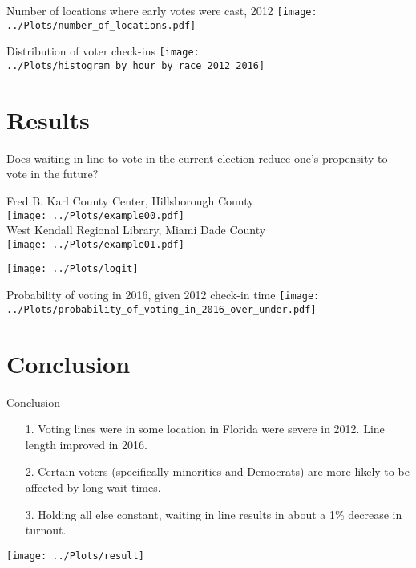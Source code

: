 \documentclass{beamer}
\begin{document}
		\begin{frame}				
		\centering 
		Number of locations where early votes were cast, 2012
		\texttt{[image: ../Plots/number\_of\_locations.pdf]}
		\end{frame}
		
		\begin{frame}				
			\centering 
			Distribution of voter check-ins
		\texttt{[image: ../Plots/histogram\_by\_hour\_by\_race\_2012\_2016]}
		\end{frame}


		
		
		
		\section{Results}
	
		\begin{frame}
		Does waiting in line to vote in the current election reduce one's propensity to vote in the future?
		\end{frame}

		\begin{frame}				
			\centering 
			Fred B. Karl County Center, Hillsborough County\\
			\texttt{[image: ../Plots/example00.pdf]} \\
			West Kendall Regional Library, Miami Dade County\\
			\texttt{[image: ../Plots/example01.pdf]} \\ 
		\end{frame}
	
		\begin{frame}
		\centering 
		\texttt{[image: ../Plots/logit]}			
		\end{frame}

		\begin{frame}				
			\centering
			Probability of voting in 2016, given 2012 check-in time 
			\texttt{[image: ../Plots/probability\_of\_voting\_in\_2016\_over\_under.pdf]}
		\end{frame}
		
		\section{Conclusion}
	
		\begin{frame}
			Conclusion
			\begin{itemize}
				\item[1.] Voting lines were in some location in Florida were severe in 2012.  Line length improved in 2016.
				\item[2.] Certain voters (specifically minorities and Democrats) are more likely to be affected by long wait times. 
				\item[3.] Holding all else constant, waiting in line results in about a 1\% decrease in turnout.
			\end{itemize}
		\end{frame}
		
		\begin{frame}
		\centering
			\texttt{[image: ../Plots/result]}
		\end{frame}
		
			
\end{document}
